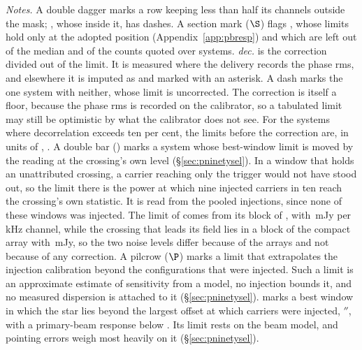\begin{table}
\centering
\caption{\textbf{Per-system sensitivity of the carrier search.} For each of
the \NSysClassA{} systems the fine-channel search covers, the
$\mathrm{EIRP}_{90}$ of its best window, retentions applied, in order of
the limit down the left half and then down the right half. Columns and
marks: Appendix~\ref{app:persys} and the notes below.}
\label{tab:persys}
\footnotesize


{\footnotesize\raggedright \emph{Notes.} A double dagger marks a row
keeping less than half its channels outside the mask; \NSysALostName, whose
\UmALostWinClause{} inside it, has dashes. A section mark
($\S$) flags \OmFlagStars, whose limits hold only at the adopted position
(Appendix~\ref{app:pbresp}) and which are left out of the median and of
the counts quoted over systems.
\emph{dec.} is the correction divided out of the limit. It is measured
where the delivery records the phase rms, and elsewhere it is imputed as
\DcImputedRule{} and marked with an asterisk. A dash marks the one system with neither,
whose limit is uncorrected. The
correction is itself a floor, because the phase rms is recorded on the
calibrator, so a tabulated limit may still be optimistic by what the
calibrator does not see. For the \DcNBigTab{} systems where decorrelation
exceeds ten per cent\DcBigCondClause, the limits before the correction are,
in units of \DcCorrUnit, \DcNomClause.
A double bar (\XwMark) marks a system whose best-window limit is moved by
the reading at the crossing's own level (\S\ref{sec:pninetysel}). In a window
that holds an unattributed crossing, a carrier reaching only the trigger
would not have stood out, so the limit there is the power at which nine
injected carriers in ten reach the crossing's own statistic. It is read
from the pooled injections, since none of these windows was injected.
The limit of \EvAStar{} comes from its block of \RcSxLimDate, with
\RcSxLimRms\,mJy per \RcSxLimChankHz\,kHz channel, while the crossing that
leads its field lies in a block of the compact array with \RcSxDiscRms\,mJy,
so the two noise levels differ because of the arrays and not because of any
correction.
A pilcrow ($\P$) marks a limit that extrapolates the injection calibration
beyond the configurations that were injected. Such a limit is an
approximate estimate of sensitivity from a model, no injection bounds it,
and no measured dispersion is attached to it (\S\ref{sec:pninetysel}).
\OffMark{} marks a best window in which the star lies beyond the
largest offset at which carriers were injected, \OffInjMaxArcsec$''$, with
a primary-beam response below \OffAcut. Its limit rests on the beam model, and
pointing errors weigh most heavily on it (\S\ref{sec:pninetysel}).\par}
\end{table}
